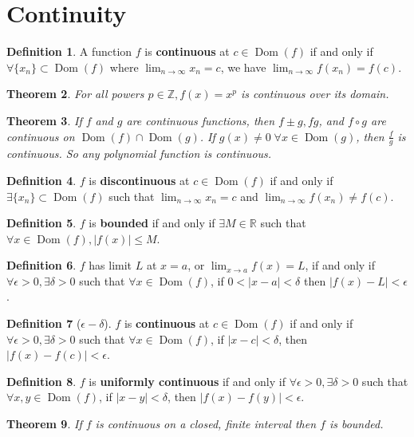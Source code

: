 \documentclass[11pt]{amsart}
\newtheorem{theorem}{Theorem}[section]
\theoremstyle{definition}
\newtheorem{definition}[theorem]{Definition}
\newcommand{\reals}{\mathbb{R}}
\newcommand{\integers}{\mathbb{Z}}
\DeclareMathOperator{\Dom}{Dom}
\newcommand{\seq}{\{ x_n \}}
\begin{document}
\section{Continuity}
\begin{definition}
	A function $f$ is \textbf{continuous} at $c \in \Dom(f)$ if and only if $\forall \seq \subset \Dom(f)$ where $\lim_{n \to \infty} x_n = c$, we have
	$\lim_{n \to \infty} f(x_n) = f(c)$.
\end{definition}
\begin{theorem}
	For all powers $p \in \integers, f(x) = x^p$ is continuous over its domain.
\end{theorem}
\begin{theorem}
	If $f$ and $g$ are continuous functions, then $f \pm g, fg$, and $f \circ g$ are continuous on $\Dom(f) \cap \Dom(g)$. If 
	$g(x) \neq 0 \; \forall x \in \Dom(g)$, then $\frac{f}{g}$ is continuous. So any polynomial function is continuous.
\end{theorem}
\begin{definition}
	$f$ is \textbf{discontinuous} at $c \in \Dom(f)$ if and only if $\exists \seq \subset \Dom(f)$ such that $\lim_{n \to \infty} x_n = c$ and 
	$\lim_{n \to \infty} f(x_n) \neq f(c).$
\end{definition}
\begin{definition}
	$f$ is \textbf{bounded} if and only if $\exists M \in \reals$ such that $\forall x \in \Dom(f), |f(x)| \leq M$.
\end{definition}
\begin{definition}
	$f$ has limit $L$ at $x = a$, or $\lim_{x \to a} f(x) = L$, if and only if $\forall \epsilon > 0, \exists \delta > 0$ such that 
	$\forall x \in \Dom(f)$, if $0 < | x - a | < \delta$ then $| f(x) - L | < \epsilon$.
\end{definition}
\begin{definition}[$\epsilon-\delta$]
	$f$ is \textbf{continuous} at $c \in \Dom(f)$ if and only if $\forall \epsilon > 0, \exists \delta > 0$ such that $\forall x \in \Dom(f)$, if 
	$| x - c | < \delta$, then $| f(x) - f(c) | < \epsilon$.
\end{definition}
\begin{definition}
	$f$ is \textbf{uniformly continuous} if and only if $\forall \epsilon > 0, \exists \delta > 0$ such that $\forall x, y \in \Dom(f)$, if 
	$| x - y | < \delta$, then $| f(x) - f(y) | < \epsilon$.
\end{definition}
\begin{theorem}
	If $f$ is continuous on a closed, finite interval then $f$ is bounded.
\end{theorem}
\end{document}
